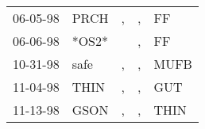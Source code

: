 \begin{supertabular}{lllll}
 06-05-98 &   PRCH &  , &  , &    FF \\
 06-06-98 &  *OS2* &    &  , &    FF \\
 10-31-98 &   safe &  , &  , &  MUFB \\
 11-04-98 &   THIN &  , &  , &   GUT \\
 11-13-98 &   GSON &  , &  , &  THIN \\
\end{supertabular}
